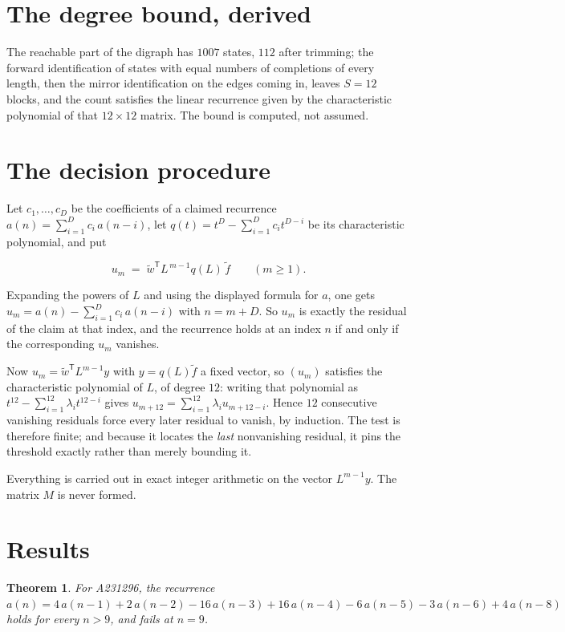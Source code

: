 \documentclass[11pt]{article}
\newtheorem{theorem}{Theorem}
\theoremstyle{definition}
\begin{document}
\section{The degree bound, derived}

The reachable part of the digraph has $1007$ states, $112$ after trimming; the forward identification of states with equal numbers of completions of every length, then the mirror identification on the edges coming in, leaves $S = 12$ blocks, and the count satisfies the linear recurrence given by the characteristic polynomial of that $12\times12$ matrix. The bound is computed, not assumed.

\section{The decision procedure}

Let $c_1,\dots,c_D$ be the coefficients of a claimed recurrence $a(n) = \sum_{i=1}^{D} c_i\,a(n-i)$, let $q(t) = t^{D} - \sum_{i=1}^{D} c_i t^{D-i}$ be its characteristic polynomial, and put

\[u_m \;=\; \tilde w^{\mathsf T} L^{\,m-1} q(L)\,\tilde f \qquad (m \ge 1).\]

Expanding the powers of $L$ and using the displayed formula for $a$, one gets $u_m = a(n) - \sum_{i=1}^{D} c_i\,a(n-i)$ with $n = m + D$. So $u_m$ is exactly the residual of the claim at that index, and the recurrence holds at an index $n$ if and only if the corresponding $u_m$ vanishes.

Now $u_m = \tilde w^{\mathsf T} L^{m-1} y$ with $y = q(L)\tilde f$ a fixed vector, so $(u_m)$ satisfies the characteristic polynomial of $L$, of degree $12$: writing that polynomial as $t^{12} - \sum_{i=1}^{12} \lambda_i t^{12-i}$ gives $u_{m+12} = \sum_{i=1}^{12} \lambda_i u_{m+12-i}$. Hence $12$ consecutive vanishing residuals force every later residual to vanish, by induction. The test is therefore finite; and because it locates the {\itshape last} nonvanishing residual, it pins the threshold exactly rather than merely bounding it.

Everything is carried out in exact integer arithmetic on the vector $L^{m-1}y$. The matrix $M$ is never formed.

\section{Results}

\begin{theorem} For A231296, the recurrence $a(n) = 4\,a(n-1) + 2\,a(n-2) - 16\,a(n-3) + 16\,a(n-4) - 6\,a(n-5) - 3\,a(n-6) + 4\,a(n-8)$ holds for every $n > 9$, and fails at $n = 9$.\end{theorem}
\end{document}
